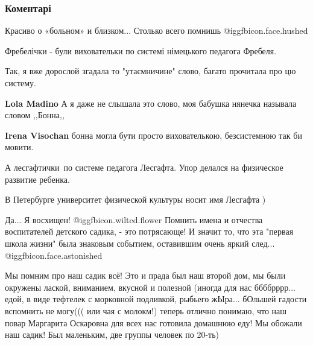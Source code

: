  
 
 
 
 
\subsubsection{Коментарі}
\label{sec:06_07_2020.fb.fb_group.story_kiev_ua.1.fotografia_vospominania.cmt}

\begin{itemize} %
Красиво о «больном» и близком... Столько всего помнишь  @igg{fbicon.face.hushed} 

Фребелічки - були виховательки по системі німецького педагога Фребеля.

\begin{itemize} %
Так, я вже дорослой згадала то "утаємничине" слово, багато прочитала про цю систему.

\textbf{Lola Madino} А я даже не слышала это слово, моя бабушка нянечка называла словом ,,Бонна,,

\textbf{Irena Visochan} бонна могла бути просто вихователькою, безсистемною так би мовити.

А лесгафтички~по системе педагога Лесгафта. Упор делался на физическое развитие ребенка.

В Петербурге университет физической культуры носит имя Лесгафта )
\end{itemize} %


Да... Я восхищен! @igg{fbicon.wilted.flower}  Помнить имена и отчества воспитателей детского садика, -
это потрясающе! И значит то, что эта "первая школа жизни" была знаковым
событием, оставившим очень яркий след... @igg{fbicon.face.astonished} 

\begin{itemize} %

Мы помним про наш садик всё! Это и прада был наш второй дом, мы были окружены
лаской, вниманием, вкусной и полезной (иногда для нас ббббрррр... едой, в виде
тефтелек с морковной подливкой, рыбьего жЫра... бОльшей гадости вспомнить не
могу((( или чая с молокм!) теперь отлично понимаю, что наш повар Маргарита
Оскаровна для всех нас готовила домашнюю еду! Мы обожали наш садик! Был
маленьким, две группы человек по 20-ть)


\end{itemize}
\end{itemize}
